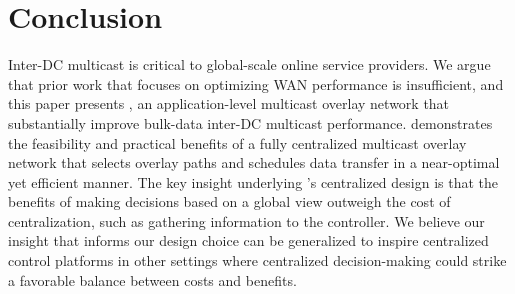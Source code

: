 \section{Conclusion}
Inter-DC multicast is critical to global-scale online service 
providers.
We argue that prior work that focuses on optimizing WAN performance
is insufficient, and this paper presents \name, 
an application-level multicast overlay network that substantially
improve bulk-data inter-DC multicast performance.
\name demonstrates the feasibility
and practical benefits of a fully centralized multicast overlay
network that selects overlay paths and schedules data transfer in
a near-optimal yet efficient manner.
The key insight underlying \name's centralized design is that the
benefits of making decisions based on a global view
outweigh the cost of centralization, such as gathering information
to the controller.
We believe our insight that informs our design choice can be
generalized to inspire centralized control platforms in other
settings where centralized decision-making could strike a favorable
balance between costs and benefits.
